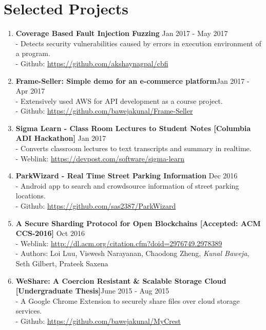 \documentclass{article}
\begin{document}
\section*{Selected Projects}
\begin{enumerate}

    \item \textbf{Coverage Based Fault Injection Fuzzing} {\hfill Jan 2017 - May 2017}\\
    - Detects security vulnerabilities caused by errors in execution environment of a program.\\
    - Github: \href{https://github.com/akshaynagpal/cbfi}{https://github.com/akshaynagpal/cbfi}

    \item \textbf{Frame-Seller: Simple demo for an e-commerce platform}{\hfill Jan 2017 - Apr 2017}\\
    - Extensively used AWS for API development as a course project.\\
    - Github: \href{https://github.com/bawejakunal/Frame-Seller}{https://github.com/bawejakunal/Frame-Seller}

    \item \textbf{Sigma Learn - Class Room Lectures to Student Notes [Columbia ADI Hackathon]} {\hfill Jan 2017}\\
    - Converts classroom lectures to text transcripts and summary in realtime.\\
    - Weblink: \href{https://devpost.com/software/sigma-learn}{https://devpost.com/software/sigma-learn}

    \item \textbf{ParkWizard - Real Time Street Parking Information} {\hfill Dec 2016}\\
    - Android app to search and crowdsource information of street parking locations.\\
    - Github: \href{https://github.com/sas2387/ParkWizard}{https://github.com/sas2387/ParkWizard}

    \item \textbf{A Secure Sharding Protocol for Open Blockchains [Accepted: ACM CCS-2016]} {\hfill Oct 2016}\\
    - Weblink: \href{http://dl.acm.org/citation.cfm?doid=2976749.2978389}{http://dl.acm.org/citation.cfm?doid=2976749.2978389}\\
    - Authors: Loi Luu, Viswesh Narayanan, Chaodong Zheng, \textit{Kunal Baweja}, Seth Gilbert, Prateek Saxena

    \item \textbf{WeShare: A Coercion Resistant \& Scalable Storage Cloud [Undergraduate Thesis]}{\hfill June 2015 - Aug 2015}\\
    - A Google Chrome Extension to securely share files over cloud storage services.\\
    - Github: \href{https://github.com/bawejakunal/MyCrest}{https://github.com/bawejakunal/MyCrest}
    

\end{enumerate}
\end{document}
